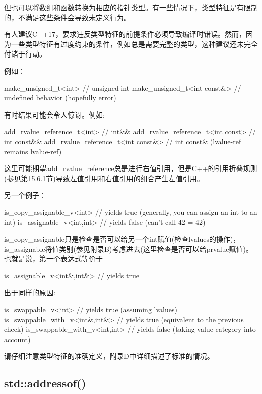 但也可以将数组和函数转换为相应的指针类型。有一些情况下，类型特征是有限制的，不满足这些条件会导致未定义行为。

\begin{notice}
有人建议C++17，要求违反类型特征的前提条件必须导致编译时错误。然而，因为一些类型特征有过度约束的条件，例如总是需要完整的类型，这种建议还未完全付诸于行动。
\end{notice}

例如：

\begin{cpp}
make_unsigned_t<int> // unsigned int
make_unsigned_t<int const&> // undefined behavior (hopefully error)
\end{cpp}

有时结果可能会令人惊讶。例如:

\begin{cpp}
add_rvalue_reference_t<int> // int&&
add_rvalue_reference_t<int const> // int const&&
add_rvalue_reference_t<int const&> // int const& (lvalue-ref remains lvalue-ref)
\end{cpp}

这里可能期望add\_rvalue\_reference总是进行右值引用，但是C++的引用折叠规则(参见第15.6.1节)导致左值引用和右值引用的组合产生左值引用。

另一个例子：

\begin{cpp}
is_copy_assignable_v<int> // yields true (generally, you can assign an int to an int)
is_assignable_v<int,int> // yields false (can't call 42 = 42)
\end{cpp}

is\_copy\_assignable只是检查是否可以给另一个int赋值(检查lvalues的操作)，is\_assignable将值类别(参见附录B)考虑进去(这里检查是否可以给prvalue赋值)。也就是说，第一个表达式等价于

\begin{cpp}
is_assignable_v<int&,int&> // yields true
\end{cpp}

出于同样的原因:

\begin{cpp}
is_swappable_v<int> // yields true (assuming lvalues)
is_swappable_with_v<int&,int&> // yields true (equivalent to the previous check)
is_swappable_with_v<int,int> // yields false (taking value category into account)
\end{cpp}

请仔细注意类型特征的准确定义，附录D中详细描述了标准的情况。

\subsection{std::addressof()}

